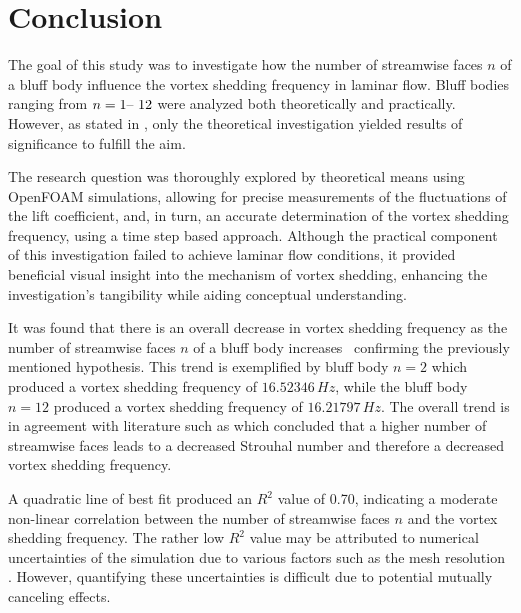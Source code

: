 \section{Conclusion}
The goal of this study was to investigate how the number of streamwise faces $n$ of a bluff body influence the vortex shedding frequency in laminar flow. Bluff bodies ranging from $n = 1 \text{\textendash\ } 12$ were analyzed both theoretically and practically. However, as stated in , only the theoretical investigation yielded results of significance to fulfill the aim. 

The research question was thoroughly explored by theoretical means using OpenFOAM simulations, allowing for precise measurements of the fluctuations of the lift coefficient, and, in turn, an accurate determination of the vortex shedding frequency, using a time step based approach. Although the practical component of this investigation failed to achieve laminar flow conditions, it provided beneficial visual insight into the mechanism of vortex shedding, enhancing the investigation's tangibility while aiding conceptual understanding.

It was found that there is an overall decrease in vortex shedding frequency as the number of streamwise faces $n$ of a bluff body increases \textemdash\ confirming the previously mentioned hypothesis. This trend is exemplified by bluff body $n = 2$ which produced a vortex shedding frequency of $16.52346\, Hz$, while the bluff body $n = 12$ produced a vortex shedding frequency of $16.21797\, Hz$. The overall trend is in agreement with literature such as \textcite{goncalves1999strouhal} which concluded that a higher number of streamwise faces leads to a decreased Strouhal number and therefore a decreased vortex shedding frequency.

A quadratic line of best fit produced an $R^2$ value of 0.70, indicating a moderate non-linear correlation between the number of streamwise faces $n$ and the vortex shedding frequency. The rather low $R^2$ value may be attributed to numerical uncertainties of the simulation due to various factors such as the mesh resolution \parencite{city7565}. However, quantifying these uncertainties is difficult due to potential mutually canceling effects. 



